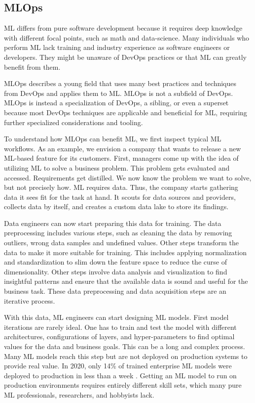 \subsection{MLOps}

ML differs from pure software development because it requires deep knowledge with different focal points,
such as math and data-science.
Many individuals who perform ML lack training and industry experience as software engineers or developers.
They might be unaware of DevOps practices or that ML can greatly benefit from them.

MLOps describes a young field that uses many best practices and techniques from DevOps and applies them to ML.
MLOps is not a subfield of DevOps.
MLOps is instead a specialization of DevOps, a sibling, or even a superset because most DevOps techniques
are applicable and beneficial for ML, requiring further specialized considerations and tooling.

To understand how MLOps can benefit ML, we first inspect typical ML workflows.
As an example, we envision a company that wants to release a new ML-based feature for its customers.
First, managers come up with the idea of utilizing ML to solve a business problem.
This problem gets evaluated and accessed.
Requirements get distilled.
We now know the problem we want to solve, but not precisely how.
ML requires data.
Thus, the company starts gathering data it sees fit for the task at hand.
It scouts for data sources and providers, collects data by itself, and creates a custom data lake to store its findings.

Data engineers can now start preparing this data for training.
The data preprocessing includes various steps, such as cleaning the data by removing outliers, 
wrong data samples and undefined values.
Other steps transform the data to make it more suitable for training.
This includes applying normalization and standardization to
slim down the feature space to reduce the curse of dimensionality.
Other steps involve data analysis and visualization to find insightful 
patterns and ensure that the available data is sound and useful for the business task.
These data preprocessing and data acquisition steps are an iterative process.

With this data, ML engineers can start designing ML models.
First model iterations are rarely ideal.
One has to train and test the model with different architectures, configurations of layers, and hyper-parameters
to find optimal values for the data and business goals.
This can be a long and complex process.
Many ML models reach this step but are not deployed on production systems to provide real value.
In 2020, only 14\% of trained enterprise ML models were deployed to production in less than a week \cite{algorithmia_state_of_enterprise_ml}.
Getting an ML model to run on production environments requires entirely different skill sets,
which many pure ML professionals, researchers, and hobbyists lack.


